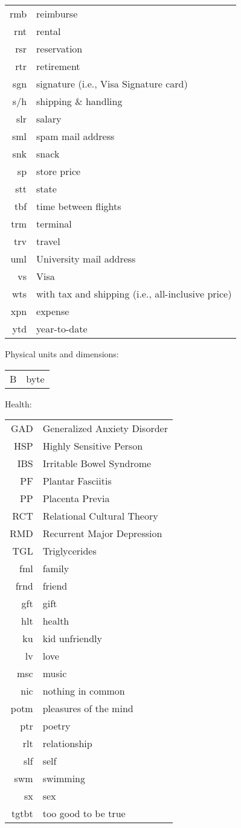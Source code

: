 \documentclass[12pt,twoside]{article}
\begin{document}
\begin{longtable}[>{\bfseries}l]{>{\ttfamily}r l}
rmb & reimburse \\
rnt & rental \\
rsr & reservation \\
rtr & retirement \\
sgn & signature (i.e., Visa Signature card) \\
s/h & shipping \& handling \\
slr & salary \\
sml & spam mail address \\
snk & snack \\
sp & store price \\
stt & state \\
tbf & time between flights \\
trm & terminal \\
trv & travel \\
uml & University mail address \\
vs & Visa \\
wts & with tax and shipping (i.e., all-inclusive price) \\
xpn & expense \\
ytd & year-to-date \\
\end{longtable}

Physical units and dimensions:
\begin{longtable}[>{\bfseries}l]{>{\ttfamily}r l}
B & byte \\
\end{longtable}

Health: %
\begin{longtable}[>{\bfseries}l]{>{\ttfamily}r l}
GAD & Generalized Anxiety Disorder \\
HSP & Highly Sensitive Person \\
IBS & Irritable Bowel Syndrome \\
PF & Plantar Fasciitis \\
PP & Placenta Previa \\
RCT & Relational Cultural Theory \\
RMD & Recurrent Major Depression \\
TGL & Triglycerides \\
fml & family \\
frnd & friend \\
gft & gift \\
hlt & health \\
ku & kid unfriendly \\
lv & love \\
msc & music \\
nic & nothing in common \\
potm & pleasures of the mind \\
ptr & poetry \\
rlt & relationship \\
slf & self \\
swm & swimming \\
sx & sex \\
tgtbt & too good to be true \\
\end{longtable}
\end{document}
